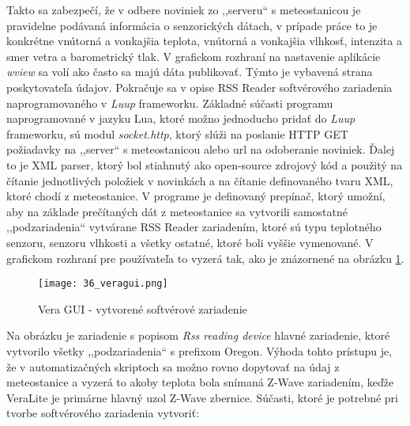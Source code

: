 Takto sa zabezpečí, že v odbere noviniek zo ,,serveru`` s meteostanicou je pravidelne podávaná informácia o senzorických dátach, v prípade práce to je konkrétne vnútorná a vonkajšia teplota, vnútorná a vonkajšia vlhkosť, intenzita a smer vetra a barometrický tlak. V grafickom rozhraní na nastavenie aplikácie \textit{wview} sa volí ako často sa majú dáta publikovať. Týmto je vybavená  strana poskytovateľa údajov. Pokračuje sa v opise RSS Reader softvérového zariadenia naprogramovaného v \textit{Luup} frameworku. Základné súčasti programu naprogramované v jazyku Lua, ktoré možno jednoducho pridať do \textit{Luup} frameworku, sú  modul \textit{socket.http}, ktorý slúži na poslanie HTTP GET požiadavky na ,,server`` s meteostanicou alebo url na odoberanie noviniek. Ďalej to je XML parser, ktorý bol stiahnutý ako open-source zdrojový kód a použitý na čítanie jednotlivých položiek v novinkách a na čítanie definovaného tvaru XML, ktoré chodí z meteostanice. V programe je definovaný prepínač, ktorý umožní, aby na základe prečítaných dát z meteostanice sa vytvorili samostatné ,,podzariadenia`` vytvárane RSS Reader zariadením, ktoré sú typu teplotného senzoru, senzoru vlhkosti a všetky ostatné, ktoré boli vyššie vymenované. V grafickom rozhraní pre používateľa to vyzerá tak, ako je znázornené na obrázku \ref{36_veragui}. 
\begin{figure}[!htbp]
\centering
\texttt{[image: 36\_veragui.png]}
\caption{Vera GUI - vytvorené softvérové zariadenie}
\label{36_veragui}
\end{figure} 
Na obrázku je zariadenie s popisom \textit{Rss reading device} hlavné zariadenie, ktoré vytvorilo všetky ,,podzariadenia`` s prefixom Oregon. Výhoda tohto prístupu je, že v automatizačných skriptoch sa možno rovno dopytovať na údaj z meteostanice a vyzerá to akoby teplota bola snímaná Z-Wave zariadením, keďže VeraLite je primárne hlavný uzol Z-Wave zbernice. Súčasti, ktoré je potrebné pri tvorbe softvérového zariadenia vytvoriť:
